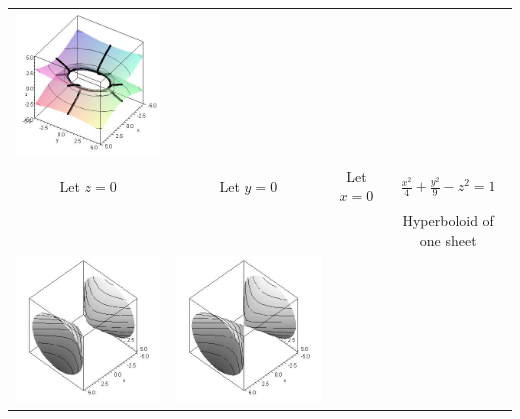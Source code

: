 \begin{center}
\begin{tabular}{cccc}
\includegraphics[width=\mywidth]{functions/quadric-4}
\\
Let $z=0$ &
Let $y=0$ &
Let $x=0$ &
$\frac{x^2}{4}+\frac{y^2}{9}-z^2 =1$\\
&&&Hyperboloid of one sheet
\\
\includegraphics[width=\mywidth]{functions/quadric-5}&
\includegraphics[width=\mywidth]{functions/quadric-6}&

\end{tabular}
\end{center}
